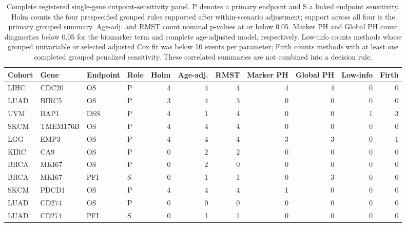 \begin{table}[H]
\centering
\scriptsize
\caption{Complete registered single-gene cutpoint-sensitivity panel. P denotes a primary endpoint and S a linked endpoint sensitivity. Holm counts the four prespecified grouped rules supported after within-scenario adjustment; support across all four is the primary grouped summary. Age-adj. and RMST count nominal p-values at or below 0.05. Marker PH and Global PH count diagnostics below 0.05 for the biomarker term and complete age-adjusted model, respectively. Low-info counts methods whose grouped univariable or selected adjusted Cox fit was below 10 events per parameter; Firth counts methods with at least one completed grouped penalized sensitivity. These correlated summaries are not combined into a decision rule.}
\label{tab:single-gene-benchmark-full-overview}
\begin{tabular}{llllrrrrrrr}
\toprule
Cohort & Gene & Endpoint & Role & Holm & Age-adj. & RMST & Marker PH & Global PH & Low-info & Firth \\
\midrule
LIHC & CDC20 & OS & P & 4 & 4 & 4 & 4 & 4 & 0 & 0 \\
LUAD & BIRC5 & OS & P & 3 & 4 & 3 & 0 & 0 & 0 & 0 \\
UVM & BAP1 & DSS & P & 4 & 1 & 4 & 0 & 0 & 1 & 3 \\
SKCM & TMEM176B & OS & P & 4 & 4 & 4 & 0 & 0 & 0 & 0 \\
LGG & EMP3 & OS & P & 4 & 4 & 4 & 3 & 3 & 0 & 1 \\
KIRC & CA9 & OS & P & 0 & 2 & 2 & 0 & 0 & 0 & 0 \\
BRCA & MKI67 & OS & P & 0 & 2 & 0 & 0 & 0 & 0 & 0 \\
BRCA & MKI67 & PFI & S & 0 & 1 & 1 & 0 & 3 & 0 & 0 \\
SKCM & PDCD1 & OS & P & 4 & 4 & 4 & 1 & 0 & 0 & 0 \\
LUAD & CD274 & OS & P & 0 & 0 & 0 & 0 & 0 & 0 & 0 \\
LUAD & CD274 & PFI & S & 0 & 1 & 1 & 0 & 0 & 0 & 0 \\
\bottomrule
\end{tabular}
\end{table}
